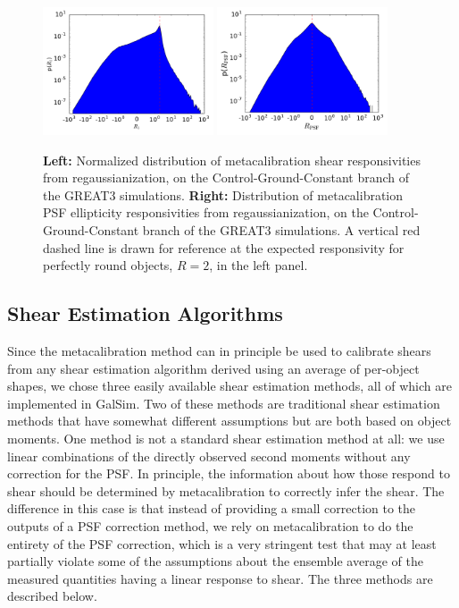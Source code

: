 \documentclass[iop]{emulateapj}
\begin{document}
\begin{figure}
\begin{center}
\includegraphics[width=0.45\textwidth]{./Plots/R1_hist.pdf}
\includegraphics[width=0.45\textwidth]{./Plots/a1_hist.pdf}
\end{center}
\caption{{\bf Left:} Normalized distribution of metacalibration shear
  responsivities from regaussianization, on the
  Control-Ground-Constant branch of the GREAT3 simulations.  {\bf
    Right:} Distribution of metacalibration PSF ellipticity
  responsivities from regaussianization, on the
  Control-Ground-Constant branch of the GREAT3 simulations. A
  vertical red dashed line is drawn for reference at the expected
  responsivity for perfectly round objects, $R=2$, in the left
  panel. }
\label{fig:calibhist}
\end{figure}


\subsection{Shear Estimation Algorithms}

Since the metacalibration method can in principle be used to calibrate
shears from any shear estimation algorithm derived using an average of per-object shapes, we chose three easily
available shear estimation methods, all of which are implemented in
GalSim.  Two of these methods are traditional shear estimation
methods that have somewhat different assumptions but are both based on
object moments.  One method is not a standard shear estimation method
at all: we use linear combinations of the directly observed second
moments without any correction for the PSF.  In principle, the
information about how those respond to shear should be determined by
metacalibration to correctly infer the shear.  The difference in this
case is that instead of providing a small correction to the outputs of
a PSF correction method, we rely on metacalibration to do the entirety
of the PSF correction, which is a very stringent test that may at least 
partially violate some of the assumptions about the ensemble average of the measured quantities having a linear
response to shear.  The three methods are described below.
\end{document}

